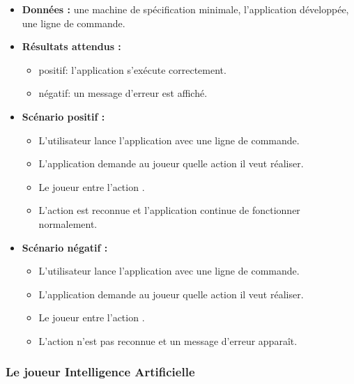 \begin{itemize}
    \item \textbf{Données :} une machine de spécification minimale, l'application développée, une ligne de commande.
    \item \textbf{Résultats attendus :} 
        \begin{itemize}
            \item positif: l'application s'exécute correctement. \item négatif: un message d'erreur est affiché.
        \end{itemize}
    \item \textbf{Scénario positif :}
    \begin{itemize}
        \item L'utilisateur lance l'application avec une ligne de commande.
        \item L'application demande au joueur quelle action il veut réaliser.
        \item Le joueur entre l'action .
        \item L'action est reconnue et l'application continue de fonctionner normalement.
    \end{itemize}
    \item \textbf{Scénario négatif :}
    \begin{itemize}
        \item L'utilisateur lance l'application avec une ligne de commande.
        \item L'application demande au joueur quelle action il veut réaliser.
        \item Le joueur entre l'action .
        \item L'action n'est pas reconnue et un message d'erreur apparaît.
    \end{itemize}
\end{itemize}

\subsubsection{Le joueur Intelligence Artificielle}

